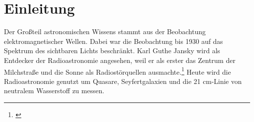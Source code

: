 \section{Einleitung}
Der Großteil astronomischen Wissens stammt aus der Beobachtung elektromagnetischer Wellen. Dabei war die Beobachtung bis 1930 auf das Spektrum des sichtbaren Lichts beschränkt. Karl Guthe Jansky wird als Entdecker der Radioastronomie angesehen, weil er als erster das Zentrum der Milchstraße und die Sonne als Radiostörquellen ausmachte.\footnote{\cite{sky}} Heute wird die Radioastronomie genutzt um Quasare, Seyfertgalaxien und die 21 cm-Linie von neutralem Wasserstoff zu messen.
